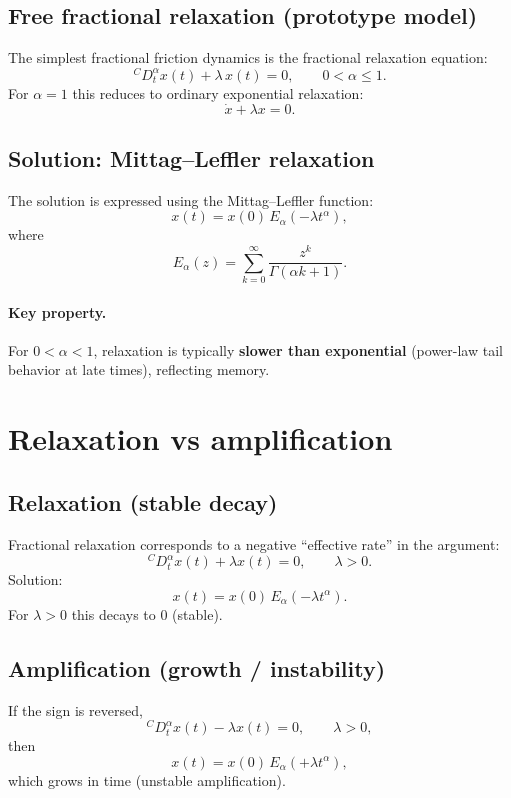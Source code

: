 \subsection{Free fractional relaxation (prototype model)}
The simplest fractional friction dynamics is the fractional relaxation equation:
\begin{equation}
\boxed{
{}^{C}D_t^\alpha x(t) + \lambda\,x(t)=0,
\qquad 0<\alpha\le 1.
}
\end{equation}
For $\alpha=1$ this reduces to ordinary exponential relaxation:
\[
\dot{x}+\lambda x=0.
\]

\subsection{Solution: Mittag--Leffler relaxation}
The solution is expressed using the Mittag--Leffler function:
\begin{equation}
\boxed{
x(t)=x(0)\,E_\alpha(-\lambda t^\alpha),
}
\end{equation}
where
\begin{equation}
E_\alpha(z)=\sum_{k=0}^\infty \frac{z^k}{\Gamma(\alpha k+1)}.
\end{equation}

\paragraph{Key property.}
For $0<\alpha<1$, relaxation is typically \textbf{slower than exponential}
(power-law tail behavior at late times), reflecting memory.


\section{Relaxation vs amplification}

\subsection{Relaxation (stable decay)}
Fractional relaxation corresponds to a negative ``effective rate'' in the argument:
\begin{equation}
{}^{C}D_t^\alpha x(t) + \lambda x(t)=0,
\qquad \lambda>0.
\end{equation}
Solution:
\[
x(t)=x(0)\,E_\alpha(-\lambda t^\alpha).
\]
For $\lambda>0$ this decays to $0$ (stable).

\subsection{Amplification (growth / instability)}
If the sign is reversed,
\begin{equation}
\boxed{
{}^{C}D_t^\alpha x(t) - \lambda x(t)=0,
\qquad \lambda>0,
}
\end{equation}
then
\begin{equation}
x(t)=x(0)\,E_\alpha(+\lambda t^\alpha),
\end{equation}
which grows in time (unstable amplification).

